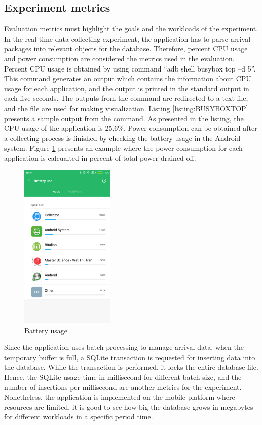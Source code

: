\subsection{Experiment metrics}
Evaluation metrics must highlight the goals and the workloads of the experiment. In the real-time data collecting experiment, the application has to parse arrival packages into relevant objects for the database. Therefore, percent CPU usage and power consumption are considered the metrics used in the evaluation. Percent CPU usage is obtained by using command “adb shell busybox top –d 5”. This command generates an output which contains the information about CPU usage for each application, and the output is printed in the standard output in each five seconds. The outputs from the command are redirected to a text file, and the file are used for making visualization. Listing \ref{listing:BUSYBOXTOP} presents a sample output from the command. As presented in the listing, the CPU usage of the application is 25.6\%. Power consumption can be obtained after a collecting process is finished by checking the battery usage in the Android system. Figure \ref{fig:Figures/PowerMetric} presents an example where the power consumption for each application is calcualted in percent of total power drained off.\\
\begin{figure}
    \centering
    \includegraphics[width=0.4\textwidth]{Figures/PowerMetric.png}
    \caption{Battery usage}
    \label{fig:Figures/PowerMetric}
\end{figure}
Since the application uses batch processing to manage arrival data, when the temporary buffer is full, a SQLite transaction is requested for inserting data into the database. While the transaction is performed, it locks the entire database file. Hence, the SQLite usage time in millisecond for different batch size, and the number of insertions per millisecond are another metrics for the experiment. Nonetheless, the application is implemented on the mobile platform where resources are limited, it is good to see how big the database grows in megabytes for different workloads in a specific period time.
